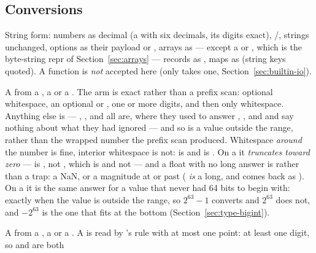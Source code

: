 \subsection{Conversions}
\label{sec:builtin-tostring}

\begin{description}[style=nextline,leftmargin=5.2em]
\item[\ic{tostring(v)}] String form: numbers as decimal (a 
  with six decimals, its digits exact), /, strings
  unchanged, options as their
  payload or , arrays as  --- except a
  \ic{[byte]} or \ic{[byte; N]}, which is the byte-string repr
   of Section~\ref{sec:arrays} --- records as
  , maps as  (string keys
  quoted). A function is \emph{not} accepted here (only  takes
  one, Section~\ref{sec:builtin-io}).
\item[\ic{tolong(x)}] A  from a , a  or a
  .
  The  arm is exact rather than a prefix scan: optional whitespace,
  an optional \ic{+} or \ic{-}, one or more digits, and then only
  whitespace. Anything else is  --- ,
  ,  and  all are,
  where they used to answer , ,  and  and say
  nothing about what they had ignored --- and so is a value outside the
   range, rather than the wrapped number the prefix scan produced.
  Whitespace \emph{around} the number is fine, interior whitespace is not:
   is  and  is .
  On a  it \emph{truncates toward zero} ---  is
  , not , which is  and not  ---
  and a float with no long answer is  rather than a trap: a NaN, or
  a magnitude at or past  (
  \emph{is} a long, and comes back as ). On a 
  it is the same answer for a value that never had 64 bits to begin with:
   exactly when the value is outside the  range, so
  $2^{63} - 1$ converts and $2^{63}$ does not, and $-2^{63}$ is the one that
  fits at the bottom (Section~\ref{sec:type-bigint}).
\item[\ic{tofloat(x)}] A  from a , a  or a
  .
  A  is read by 's rule with at most one point: at least
  one digit, so  and  are both

\end{description}

